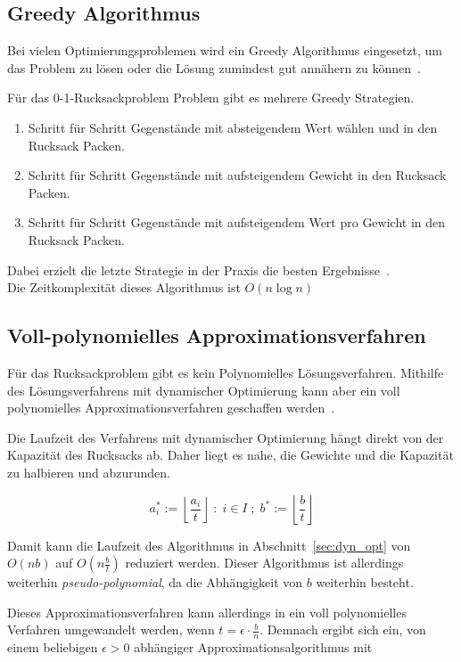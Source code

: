 \documentclass[12pt, a4paper, ngerman]{article}
\begin{document}
\subsection{Greedy Algorithmus}

Bei vielen Optimierungsproblemen wird ein Greedy Algorithmus eingesetzt,
um das Problem zu lösen oder die Lösung zumindest gut annähern zu können~\cite{paper102}.

Für das 0-1-Rucksackproblem Problem gibt es mehrere Greedy Strategien.

\begin{enumerate}
  \item Schritt für Schritt Gegenstände mit absteigendem Wert wählen und in den Rucksack Packen.
  \item Schritt für Schritt Gegenstände mit aufsteigendem Gewicht in den Rucksack Packen.
  \item Schritt für Schritt Gegenstände mit aufsteigendem Wert pro Gewicht in den Rucksack Packen.
\end{enumerate}

Dabei erzielt die letzte Strategie in der Praxis die besten Ergebnisse~\cite{paper102}.\\
Die Zeitkomplexität dieses Algorithmus ist \(O(n\log n)\)

\subsection{Voll-polynomielles Approximationsverfahren}
\label{sec:vp_approx}

Für das Rucksackproblem gibt es kein Polynomielles Lösungsverfahren.
Mithilfe des Lösungsverfahrens mit dynamischer Optimierung
kann aber ein voll polynomielles Approximationsverfahren geschaffen werden~\cite{KombinatorischeOptimierung}.

Die Laufzeit des Verfahrens mit dynamischer Optimierung
hängt direkt von der Kapazität des Rucksacks ab.
Daher liegt es nahe, die Gewichte und die Kapazität zu halbieren und abzurunden.

\[
  a^*_i := \left\lfloor\frac{a_i}{t}\right\rfloor \;:\; i\in I\;;\; b^* := \left\lfloor\frac{b}{t}\right\rfloor
\]

Damit kann die Laufzeit des Algorithmus in Abschnitt~\ref{sec:dyn_opt}
von \(O(nb)\) auf \(O(n\frac{b}{t})\) reduziert werden.
Dieser Algorithmus ist allerdings weiterhin \emph{pseudo-polynomial},
da die Abhängigkeit von \(b\) weiterhin besteht.

Dieses Approximationsverfahren kann allerdings in ein voll polynomielles Verfahren umgewandelt werden,
wenn \(t=\epsilon\cdot\frac{b}{n}\).
Demnach ergibt sich ein, von einem beliebigen \(\epsilon>0\) abhängiger Approximationsalgorithmus
mit
\end{document}
